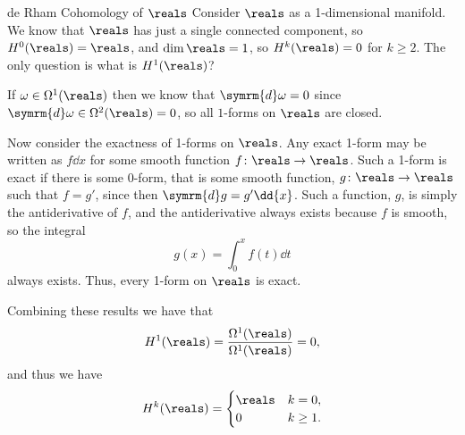 \documentclass[fleqn]{NotesClass}
\renewcommand{\dl}{\symrm{d}}
\begin{document}
    \begin{exm}{de Rham Cohomology of \(\reals\)}{}
        Consider \(\reals\) as a 1-dimensional manifold.
        We know that \(\reals\) has just a single connected component, so \(H^0(\reals) = \reals\), and \(\dim \reals = 1\), so \(H^k(\reals) = 0\) for \(k \ge 2\).
        The only question is what is \(H^1(\reals)\)?
        
        If \(\omega \in \Omega^1(\reals)\) then we know that \(\dl \omega = 0\) since \(\dl \omega \in \Omega^2(\reals) = 0\), so all \(1\)-forms on \(\reals\) are closed.
        
        Now consider the exactness of 1-forms on \(\reals\).
        Any exact 1-form may be written as \(f \dd{x}\) for some smooth function \(f \colon \reals \to \reals\).
        Such a 1-form is exact if there is some 0-form, that is some smooth function, \(g \colon \reals \to \reals\) such that \(f = g'\), since then \(\dl g = g' \dd{x}\).
        Such a function, \(g\), is simply the antiderivative of \(f\), and the antiderivative always exists because \(f\) is smooth, so the integral
        \begin{equation}
            g(x) = \int_0^x f(t) \dd{t}
        \end{equation}
        always exists.
        Thus, every 1-form on \(\reals\) is exact.
        
        Combining these results we have that
        \begin{equation}
            H^1(\reals) = \frac{\Omega^1(\reals)}{\Omega^1(\reals)} = 0,
        \end{equation}
        and thus we have
        \begin{equation}
            H^k(\reals) = 
            \begin{cases}
                \reals & k = 0,\\
                0 & k \ge 1.
            \end{cases}
        \end{equation}
    \end{exm}
    
\end{document}
